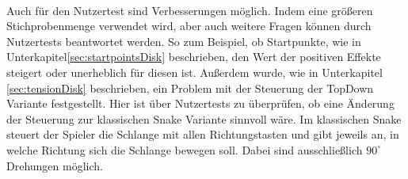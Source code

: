 \\
Auch für den Nutzertest sind Verbesserungen möglich. Indem eine größeren Stichprobenmenge verwendet wird, aber auch weitere Fragen können durch Nutzertests beantwortet werden. So zum Beispiel, ob Startpunkte, wie in Unterkapitel\ref{sec:startpointsDisk} beschrieben, den Wert der positiven Effekte steigert oder unerheblich für diesen ist. Außerdem wurde, wie in Unterkapitel \ref{sec:tensionDisk} beschrieben, ein Problem mit der Steuerung der TopDown Variante festgestellt. Hier ist über Nutzertests zu überprüfen, ob eine Änderung der Steuerung zur klassischen Snake Variante sinnvoll wäre. Im klassischen Snake steuert der Spieler die Schlange mit allen Richtungstasten und gibt jeweils an, in welche Richtung sich die Schlange bewegen soll. Dabei sind ausschließlich $90^\circ$ Drehungen möglich.

